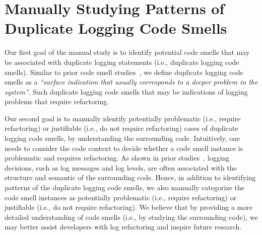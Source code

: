 \section{Manually Studying Patterns of Duplicate Logging Code Smells}
\label{sec:manual}


Our first goal of the manual study is to identify potential code smells that may be associated with duplicate logging statements (i.e., duplicate logging code smells). Similar to prior code smell studies~\cite{budgen2003software, fowler1999refactoring}, we define duplicate logging code smells as a {\em ``surface indication that usually corresponds to a deeper problem in the system''}. Such duplicate logging code smells that may be indications of logging problems that require refactoring. 

Our second goal is to manually identify potentially problematic (i.e., require refactoring) or justifiable (i.e., do not require refactoring) cases of duplicate logging code smells, by understanding the surrounding code. Intuitively, one needs to consider the code context to decide whether a code smell instance is problematic and requires refactoring. As shown in prior studies~\cite{Zhu:2015:LLH:2818754.2818807, Fu:2014:DLE:2591062.2591175, Li2018}, logging decisions, such as log messages and log levels, are often associated with the structure and semantic of the surrounding code. Hence, in addition to identifying patterns of the duplicate logging code smells, we also manually categorize the code smell instances as potentially problematic (i.e., require refactoring) or justifiable (i.e., do not require refactoring). We believe that by providing a more detailed understanding of code smells (i.e., by studying the surrounding code), we may better assist developers with log refactoring and inspire future research.





